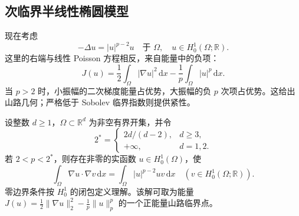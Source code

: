 \subsection{次临界半线性椭圆模型}
\label{b2:subsec:140504}

现在考虑
\[
 -\Delta u=|u|^{p-2}u\quad\text{于 }\Omega,
 \quad u\in H_0^1(\Omega;\mathbb R).
\]
这里的右端与线性 Poisson 方程相反，来自能量中的负项：
\[
 J(u)=\frac12\int_\Omega|\nabla u|^2\,\mathrm dx
          -\frac1p\int_\Omega|u|^p\,\mathrm dx.
\]
当 \(p>2\) 时，小振幅的二次梯度能量占优势，大振幅的负 \(p\) 次项占优势。这给出山路几何；严格低于 Sobolev 临界指数则提供紧性。

\begin{theorem}[次临界幂方程的非零弱解]\label{b2:thm:14-subcritical-mountain-model}
设整数 \(d\ge1\)，\(\Omega\subset\mathbb R^d\) 为非空有界开集，并令
\[
 2^*=\begin{cases}2d/(d-2),&d\ge3,\\+\infty,&d=1,2.\end{cases}
\]
若 \(2<p<2^*\)，则存在非零的实函数 \(u\in H_0^1(\Omega)\)，使
\[
 \int_\Omega\nabla u\cdot\nabla v\,\mathrm dx
   =\int_\Omega|u|^{p-2}uv\,\mathrm dx
 \quad(v\in H_0^1(\Omega;\mathbb R)).
\]
零边界条件按 \(H_0^1\) 的闭包定义理解。该解可取为能量
\(J(u)=\tfrac12\|\nabla u\|_2^2-\tfrac1p\|u\|_p^p\)
的一个正能量山路临界点。
\end{theorem}
